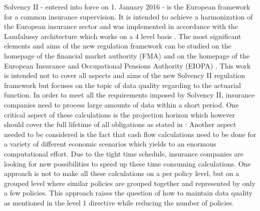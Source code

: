 Solvency II - entered into force on 1. January 2016 - is the European framework for a common insurance supervision. It is intended to achieve a harmonization of the European insurance sector and was implemented in accordance with the Lamfalussy architecture which works on a 4 level basis \cite{Lamfalussy_homepage}. The most significant elements and aims of the new regulation framework can be studied on the homepage of the financial market authority (FMA) \cite{FMA_homepage} and on the homepage of the  European Insurance and Occupational Pensions Authority (EIOPA) \cite{EIOPA_homepage}. This work is intended not to cover all aspects and aims of the new Solvency II regulation framework but focuses on the topic of data quality regarding to the actuarial function. In order to meet all the requirements imposed by Solvency II, insurance companies need to process large amounts of data within a short period. One critical aspect of these calculations is the projection horizon which however should cover the full lifetime of all obligations as stated in \cite{Time_horizon}:
Another aspect needed to be considered is the fact that cash flow calculations need to be done for a variety of different economic scenarios which yields to an enormous computational effort. Due to the tight time schedule, insurance companies are looking for new possibilities to speed up these time consuming calculations. One approach is not to make all these calculations on a per policy level, but on a grouped level where similar policies are grouped together and represented by only a few policies. This approach raises the question of how to maintain data quality as mentioned in the level 1 directive \cite{Directive} while reducing the number of policies.


